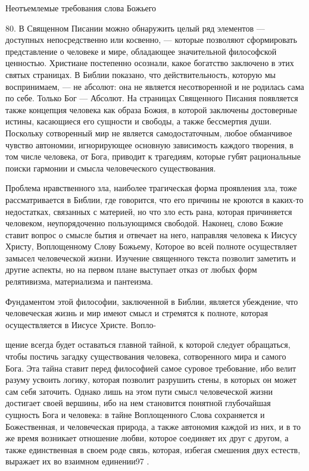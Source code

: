 \documentclass[a5paper,10pt]{article}
\begin{document}
Неотъемлемые требования слова Божьего

80. В Священном Писании можно обнаружить целый ряд элементов — доступных
непосредственно или косвенно, — которые позволяют сформировать представление о
человеке и мире, обладающее значительной философской ценностью. Христиане
постепенно осознали, какое богатство заключено в этих святых страницах. В
Библии показано, что действительность, которую мы воспринимаем, — не абсолют:
она не является несотворенной и не родилась сама по себе. Только Бог — Абсолют.
На страницах Священного Писания появляется также концепция человека как образа
Божия, в которой заключены достоверные истины, касающиеся его сущности и
свободы, а также бессмертия души. Поскольку сотворенный мир не является
самодостаточным, любое обманчивое чувство автономии, игнорирующее основную
зависимость каждого творения, в том числе человека, от Бога, приводит к
трагедиям, которые губят рациональные поиски гармонии и смысла человеческого
существования.

Проблема нравственного зла, наиболее трагическая форма проявления зла, тоже
рассматривается в Библии, где говорится, что его причины не кроются в каких-то
недостатках, связанных с материей, но что зло есть рана, которая причиняется
человеком, неупорядоченно пользующимся свободой. Наконец, слово Божие ставит
вопрос о смысле бытия и отвечает на него, направляя человека к Иисусу Христу,
Воплощенному Слову Божьему, Которое во всей полноте осуществляет замысел
человеческой жизни. Изучение священного текста позволит заметить и другие
аспекты, но на первом плане выступает отказ от любых форм релятивизма,
материализма и пантеизма.

Фундаментом этой философии, заключенной в Библии, является убеждение, что
человеческая жизнь и мир имеют смысл и стремятся к полноте, которая
осуществляется в Иисусе Христе. Вопло-

щение всегда будет оставаться главной тайной, к которой следует обращаться,
чтобы постичь загадку существования человека, сотворенного мира и самого Бога.
Эта тайна ставит перед философией самое суровое требование, ибо велит разуму
усвоить логику, которая позволит разрушить стены, в которых он может сам себя
заточить. Однако лишь на этом пути смысл человеческой жизни достигает своей
вершины, ибо на нем становится понятной глубочайшая сущность Бога и человека: в
тайне Воплощенного Слова сохраняется и Божественная, и человеческая природа, а
также автономия каждой из них, и в то же время возникает отношение любви,
которое соединяет их друг с другом, а также единственная в своем роде связь,
которая, избегая смешения двух естеств, выражает их во взаимном единении97 .
\end{document}
